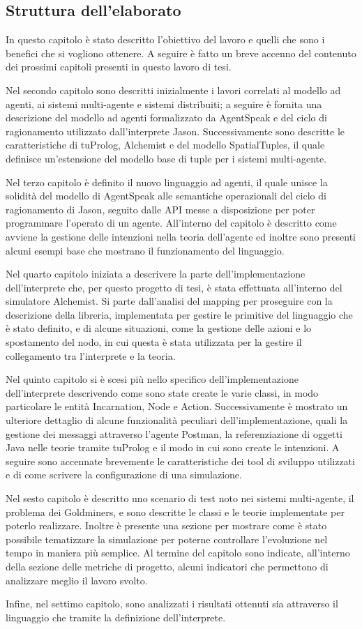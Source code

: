 \subsection*{Struttura dell'elaborato}
In questo capitolo è stato descritto l'obiettivo del lavoro e quelli che sono i benefici che si vogliono ottenere.
A seguire è fatto un breve accenno del contenuto dei prossimi capitoli presenti in questo lavoro di tesi.

Nel secondo capitolo sono descritti inizialmente i lavori correlati al modello ad agenti, ai sistemi multi-agente e sistemi distribuiti; a seguire è fornita una descrizione del modello ad agenti formalizzato da AgentSpeak e del ciclo di ragionamento utilizzato dall'interprete Jason.
Successivamente sono descritte le caratteristiche di tuProlog, Alchemist e del modello SpatialTuples, il quale definisce un'estensione del modello base di tuple per i sistemi multi-agente.

Nel terzo capitolo è definito il nuovo linguaggio ad agenti, il quale unisce la solidità del modello di AgentSpeak alle semantiche operazionali del ciclo di ragionamento di Jason, seguito dalle API messe a disposizione per poter programmare l'operato di un agente.
All'interno del capitolo è descritto come avviene la gestione delle intenzioni nella teoria dell'agente ed inoltre sono presenti alcuni esempi base che mostrano il funzionamento del linguaggio.

Nel quarto capitolo iniziata a descrivere la parte dell'implementazione dell'interprete che, per questo progetto di tesi, è stata effettuata all'interno del simulatore Alchemist.
Si parte dall'analisi del mapping per proseguire con la descrizione della libreria, implementata per gestire le primitive del linguaggio che è stato definito, e di alcune situazioni, come la gestione delle azioni e lo spostamento del nodo, in cui questa è stata utilizzata per la gestire il collegamento tra l'interprete e la teoria.

Nel quinto capitolo si è scesi più nello specifico dell'implementazione dell'interprete descrivendo come sono state create le varie classi, in modo particolare le entità Incarnation, Node e Action.
Successivamente è mostrato un ulteriore dettaglio di alcune funzionalità peculiari dell'implementazione, quali la gestione dei messaggi attraverso l'agente Postman, la referenziazione di oggetti Java nelle teorie tramite tuProlog e il modo in cui sono create le intenzioni.
A seguire sono accennate brevemente le caratteristiche dei tool di sviluppo utilizzati e di come scrivere la configurazione di una simulazione.

Nel sesto capitolo è descritto uno scenario di test noto nei sistemi multi-agente, il problema dei Goldminers, e sono descritte le classi e le teorie implementate per poterlo realizzare. Inoltre è presente una sezione per mostrare come è stato possibile tematizzare la simulazione per poterne controllare l'evoluzione nel tempo in maniera più semplice.
Al termine del capitolo sono indicate, all'interno della sezione delle metriche di progetto, alcuni indicatori che permettono di analizzare meglio il lavoro svolto.

Infine, nel settimo capitolo, sono analizzati i risultati ottenuti sia attraverso il linguaggio che tramite la definizione dell'interprete.
